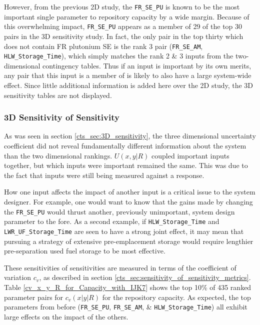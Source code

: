 However, from the previous 2D study, the \texttt{FR\_SE\_PU}
is known to be the most important single parameter to repository capacity by a wide 
margin.  Because of this overwhelming impact, \texttt{FR\_SE\_PU} appears as a member of
29 of the top 30 pairs in the 3D sensitivity study.  In fact, the only pair in the 
top thirty which does not contain FR plutonium SE is the rank 3 pair
(\texttt{FR\_SE\_AM}, \texttt{HLW\_Storage\_Time}), which simply matches the 
rank 2 \& 3 inputs from the two-dimensional contingency tables.
Thus if an input is important by its own merits, any pair that this input is 
a member of is likely to also have a large system-wide effect.
Since little additional information is added here over the 2D study, the 
3D sensitivity tables are not displayed.

\subsubsection{3D Sensitivity of Sensitivity}
\label{cts_sec:3D_sensitivity_of_sensitivity}



As was seen in section \ref{cts_sec:3D_sensitivity}, the three dimensional 
uncertainty coefficient did not reveal fundamentally different information
about the system than the two dimensional rankings.  $U(x,y|R)$ coupled 
important inputs together, but which inputs were important remained the same.  This was
due to the fact that inputs were still being measured against a response.

How one input affects the impact of another input is a critical issue to the system designer.  
For example, one would want to know that the gains made by
changing the \texttt{FR\_SE\_PU} would thrust another, previously unimportant, system design 
parameter to the fore.  As a second example, if \texttt{HLW\_Storage\_Time} and 
\texttt{LWR\_UF\_Storage\_Time} are seen to have a strong joint effect, it may 
mean that pursuing a strategy of extensive pre-emplacement storage would require 
lengthier pre-separation used fuel storage to be most effective.

These sensitivities of sensitivities are measured in terms of the coefficient of 
variation $c_v$, as described in section \ref{cts_sec:sensitivity_of_sensitivity_metrics}.
Table \ref{cv_x_y_R_for_Capacity_with_IJK7} shows the top 10\% of 435 ranked parameter 
pairs for $c_v(x|y|R)$ for the repository capacity.
As expected, the top parameters from before (\texttt{FR\_SE\_PU}, \texttt{FR\_SE\_AM}, 
\& \texttt{HLW\_Storage\_Time}) all exhibit large effects on
the impact of the others.

